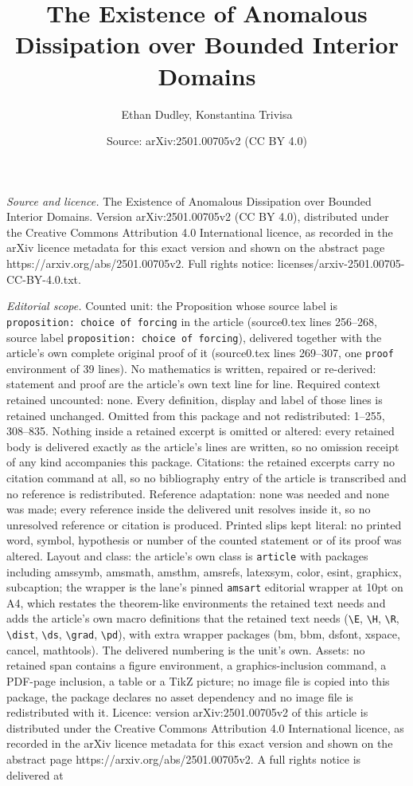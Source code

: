 \documentclass[10pt,a4paper]{amsart}
\title[The Existence of Anomalous Dissipation over Bounded Interior]{The Existence of Anomalous Dissipation over Bounded Interior Domains}
\author{Ethan Dudley, Konstantina Trivisa}
\date{Source: arXiv:2501.00705v2 (CC BY 4.0)}
\begin{document}
\maketitle

\noindent\emph{Source and licence.} The Existence of Anomalous Dissipation over Bounded Interior Domains. Version arXiv:2501.00705v2 (CC BY 4.0), distributed under the Creative Commons Attribution 4.0 International licence, as recorded in the arXiv licence metadata for this exact version and shown on the abstract page https://arxiv.org/abs/2501.00705v2. Full rights notice: licenses/arxiv-2501.00705-CC-BY-4.0.txt.\par\smallskip

\noindent\textit{Editorial scope.} Counted unit: the Proposition whose source label is \texttt{proposition: choice of forcing} in the article (source0.tex lines 256--268, source label \texttt{proposition: choice of forcing}), delivered together with the article's own complete original proof of it (source0.tex lines 269--307, one \texttt{proof} environment of 39 lines). No mathematics is written, repaired or re-derived: statement and proof are the article's own text line for line. Required context retained uncounted: none. Every definition, display and label of those lines is retained unchanged. Omitted from this package and not redistributed: 1--255, 308--835. Nothing inside a retained excerpt is omitted or altered: every retained body is delivered exactly as the article's lines are written, so no omission receipt of any kind accompanies this package. Citations: the retained excerpts carry no citation command at all, so no bibliography entry of the article is transcribed and no reference is redistributed. Reference adaptation: none was needed and none was made; every reference inside the delivered unit resolves inside it, so no unresolved reference or citation is produced. Printed slips kept literal: no printed word, symbol, hypothesis or number of the counted statement or of its proof was altered. Layout and class: the article's own class is \texttt{article} with packages including amssymb, amsmath, amsthm, amsrefs, latexsym, color, esint, graphicx, subcaption; the wrapper is the lane's pinned \texttt{amsart} editorial wrapper at 10pt on A4, which restates the theorem-like environments the retained text needs and adds the article's own macro definitions that the retained text needs (\texttt{\textbackslash E}, \texttt{\textbackslash H}, \texttt{\textbackslash R}, \texttt{\textbackslash dist}, \texttt{\textbackslash ds}, \texttt{\textbackslash grad}, \texttt{\textbackslash pd}), with extra wrapper packages (bm, bbm, dsfont, xspace, cancel, mathtools). The delivered numbering is the unit's own. Assets: no retained span contains a figure environment, a graphics-inclusion command, a PDF-page inclusion, a table or a TikZ picture; no image file is copied into this package, the package declares no asset dependency and no image file is redistributed with it. Licence: version arXiv:2501.00705v2 of this article is distributed under the Creative Commons Attribution 4.0 International licence, as recorded in the arXiv licence metadata for this exact version and shown on the abstract page https://arxiv.org/abs/2501.00705v2. A full rights notice is delivered at 
\end{document}
